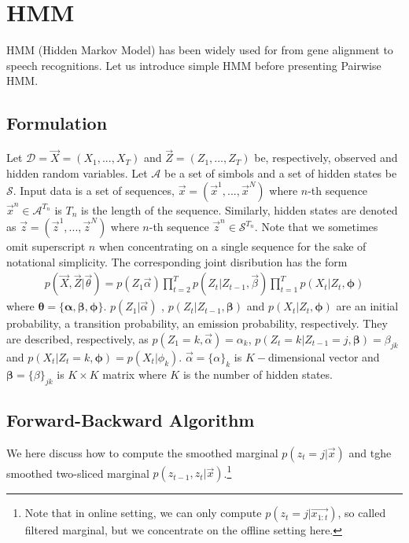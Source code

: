 %
%
\section{HMM}
HMM (Hidden Markov Model) has been widely used for from gene alignment to speech recognitions. Let us introduce simple HMM before presenting Pairwise HMM.

\subsection{Formulation}
Let $\mathcal{D}=\vec{X} = (X_1, ..., X_T)$ and $\vec{Z} = (Z_1, ..., Z_T)$ be, respectively, observed and hidden random variables. 
Let $\mathcal{A}$ be a set of simbols and a set of hidden states be $\mathcal{S}$.
Input data is a set of sequences, $\vec{x} = (\vec{x}^1, ..., \vec{x}^{N})$ where $n$-th sequence $\vec{x}^n \in \mathcal{A}^{T_n}$ is $T_n$ is the length of the sequence.
Similarly, hidden states are denoted as $\vec{z} = (\vec{z}^1, ..., \vec{z}^{N})$ where $n$-th sequence $\vec{z}^n \in \mathcal{S}^{T_n}$. Note that we sometimes omit superscript $n$ when concentrating on a single sequence for the sake of notational simplicity.
The corresponding joint disribution has the form
\begin{eqnarray}
  p(\vec{X}, \vec{Z} | \vec{\theta}) = p(Z_1\vec{\alpha}) \prod_{t=2}^T p(Z_t|Z_{t-1}, \vec{\beta}) \prod_{t=1}^T p(X_t | Z_t, \mathbf{\phi})
\end{eqnarray}
where $\mathbf{\theta} = \{\mathbf{\alpha}, \mathbf{\beta}, \mathbf{\phi} \}$. $p(Z_1| \vec{\alpha})$ , $p(Z_t|Z_{t-1}, \mathbf{\beta})$ and $p(X_t|Z_t, \mathbf{\phi})$ are an initial probability, a transition probability, an emission probability, respectively.
They are described, respectively, as $p(Z_1 = k, \vec{\alpha}) = \alpha_k$, $p(Z_t = k|Z_{t-1}=j, \mathbf{\beta}) = \beta_{jk}$ and $p(X_t|Z_t = k, \mathbf{\phi}) = p(X_t|\phi_k)$. 
$\vec{\alpha} = \{\alpha\}_k$ is $K-$dimensional vector  and $\mathbf{\beta} = \{\beta\}_{jk}$ is $K \times K$ matrix where $K$ is the number of hidden states.

\subsection{Forward-Backward Algorithm}
We here discuss how to compute the smoothed marginal $p(z_t = j| \vec{x})$ and tghe smoothed two-sliced marginal $p(z_{t-1},z_t| \vec{x})$.\footnote{Note that in online setting, we can only compute $p(z_t = j| \vec{x_{1:t}})$, so called filtered marginal, but we concentrate on the offline setting here.}

